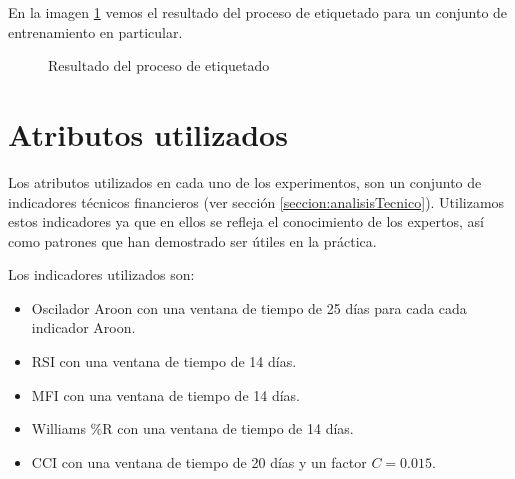 \documentclass[12pt]{scrbook}
\theoremstyle{break}
\theoremstyle{break}
\begin{document}
En la imagen \ref{imagen:etiquetado} vemos el resultado del proceso de etiquetado para un conjunto de entrenamiento en particular.

\begin{figure}[ht]
\centering
{}
\caption{\label{imagen:etiquetado} Resultado del proceso de etiquetado}
\end{figure}

\section{Atributos utilizados}
\label{seccion:atributos}
Los atributos utilizados en cada uno de los experimentos, son un conjunto de indicadores técnicos financieros (ver sección \ref{seccion:analisisTecnico}). Utilizamos estos indicadores ya que en ellos se refleja el conocimiento de los expertos, así como patrones que han demostrado ser útiles en la práctica.

Los indicadores utilizados son:
\begin{itemize}
\item Oscilador Aroon con una ventana de tiempo de 25 días para cada cada indicador Aroon.

\item RSI con una ventana de tiempo de 14 días.

\item MFI con una ventana de tiempo de 14 días.

\item Williams \%R con una ventana de tiempo de 14 días.

\item CCI con una ventana de tiempo de 20 días y un factor $C=0.015$.
\end{itemize}
\end{document}
